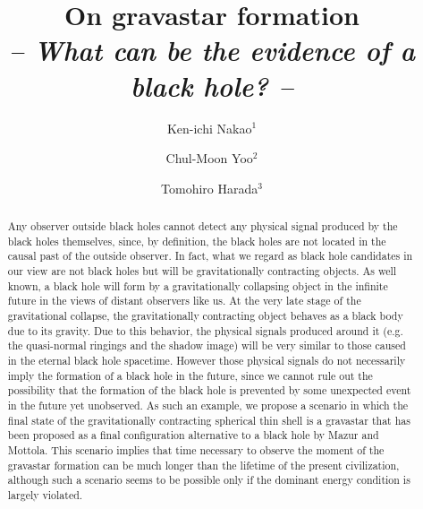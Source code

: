 \documentclass[aps,preprint,preprintnumber,nofootinbib,amsmath,amssymb,ascmac,bm,12pt]{revtex4}
\begin{document}
\title{On gravastar formation \\
{\it -- What can be the evidence of a black hole? --}}

\author{Ken-ichi Nakao$^1$}
\author{Chul-Moon Yoo$^2$}
\author{Tomohiro Harada$^3$}



\begin{abstract}
Any observer outside black holes cannot detect any physical signal produced by 
the black holes themselves, since, by definition, the black holes are not located 
in the causal past of the outside observer. 
In fact, what we regard as black hole candidates in our view are not black holes but  will be 
gravitationally contracting objects. As well known, a black hole will form by 
a gravitationally collapsing object in the infinite future in the views of distant observers like us. 
At the very late stage of the gravitational collapse, the 
gravitationally contracting object behaves as a black body due to its gravity. 
Due to this behavior, the physical signals produced around it (e.g. the quasi-normal ringings 
and the shadow image) will be very similar to those caused in the eternal black hole spacetime. 
However those physical signals do not necessarily imply 
the formation of a black hole in the future, since we cannot rule out the possibility that the formation 
of the black hole is prevented by some unexpected event in the future yet unobserved. 
As such an example, we propose a scenario in which the final state of the gravitationally contracting 
spherical thin shell is a gravastar that has been proposed as a final configuration alternative to a black 
hole by Mazur and Mottola. This scenario implies that time necessary to observe the moment of the 
gravastar formation can be much longer than the lifetime of the present civilization, 
although such a scenario seems to be possible only if the 
dominant energy condition is largely violated. 
\end{abstract}
\end{document}
